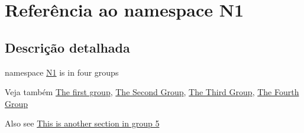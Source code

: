 \hypertarget{namespace_n1}{\section{Referência ao namespace N1}
\label{namespace_n1}
}


\subsection{Descrição detalhada}
namespace \hyperlink{namespace_n1}{N1} is in four groups \begin{DoxySeeAlso}{Veja também}
\hyperlink{group__group1}{The first group}, \hyperlink{group__group2}{The Second Group}, \hyperlink{group__group3}{The Third Group}, \hyperlink{group__group4}{The Fourth Group}
\end{DoxySeeAlso}
Also see \hyperlink{group__group5}{This is another section in group 5} 